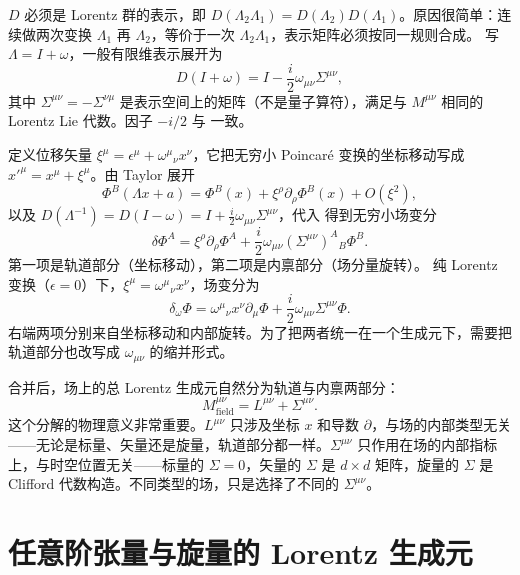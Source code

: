 $D$ 必须是 Lorentz 群的表示，即 $D(\Lambda_2\Lambda_1)=D(\Lambda_2)D(\Lambda_1)$。原因很简单：连续做两次变换 $\Lambda_1$ 再 $\Lambda_2$，等价于一次 $\Lambda_2\Lambda_1$，表示矩阵必须按同一规则合成。
写 $\Lambda=I+\omega$，一般有限维表示展开为
\begin{equation}\label{eq:ms-poincare-D-expand}
D(I+\omega)=I-\frac{i}{2}\omega_{\mu\nu}\Sigma^{\mu\nu},
\end{equation}
其中 $\Sigma^{\mu\nu}=-\Sigma^{\nu\mu}$ 是表示空间上的矩阵（不是量子算符），满足与 $M^{\mu\nu}$ 相同的 Lorentz Lie 代数。因子 $-i/2$ 与 一致。

定义位移矢量 $\xi^\mu=\epsilon^\mu+\omega^\mu{}_\nu x^\nu$，它把无穷小 Poincaré 变换的坐标移动写成 $x'^\mu=x^\mu+\xi^\mu$。由 Taylor 展开
\begin{equation*}
\Phi^B(\Lambda x+a)=\Phi^B(x)+\xi^\rho\partial_\rho\Phi^B(x)+O(\xi^2),
\end{equation*}
以及 $D(\Lambda^{-1})=D(I-\omega)=I+\frac{i}{2}\omega_{\mu\nu}\Sigma^{\mu\nu}$，代入 得到无穷小场变分
\begin{equation}\label{eq:ms-poincare-delta-Phi}
{
\delta\Phi^A=\xi^\rho\partial_\rho\Phi^A+\frac{i}{2}\omega_{\mu\nu}(\Sigma^{\mu\nu})^A{}_B\Phi^B.
}
\end{equation}
第一项是轨道部分（坐标移动），第二项是内禀部分（场分量旋转）。
纯 Lorentz 变换（$\epsilon=0$）下，$\xi^\mu=\omega^\mu{}_\nu x^\nu$，场变分为
\begin{equation*}
\delta_\omega\Phi=\omega^\mu{}_\nu x^\nu\partial_\mu\Phi+\frac{i}{2}\omega_{\mu\nu}\Sigma^{\mu\nu}\Phi.
\end{equation*}
右端两项分别来自坐标移动和内部旋转。为了把两者统一在一个生成元下，需要把轨道部分也改写成 $\omega_{\mu\nu}$ 的缩并形式。

合并后，场上的总 Lorentz 生成元自然分为轨道与内禀两部分：
\begin{equation*}{M^{\mu\nu}_{\text{field}}=L^{\mu\nu}+\Sigma^{\mu\nu}.}
\end{equation*}
这个分解的物理意义非常重要。$L^{\mu\nu}$ 只涉及坐标 $x$ 和导数 $\partial$，与场的内部类型无关——无论是标量、矢量还是旋量，轨道部分都一样。$\Sigma^{\mu\nu}$ 只作用在场的内部指标上，与时空位置无关——标量的 $\Sigma=0$，矢量的 $\Sigma$ 是 $d\times d$ 矩阵，旋量的 $\Sigma$ 是 Clifford 代数构造。不同类型的场，只是选择了不同的 $\Sigma^{\mu\nu}$。

\section{任意阶张量与旋量的 Lorentz 生成元}

